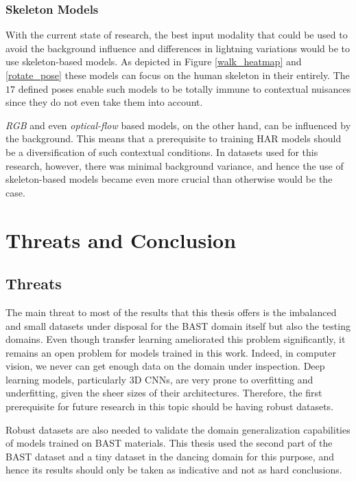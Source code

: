 \documentclass[extern,palatino]{cgMA}
\begin{document}
\subsubsection{Skeleton Models}
\label{research_question_5_4}
With the current state of research, the best input modality that could be used to avoid the background influence and differences in lightning variations would be to use skeleton-based models. As depicted in Figure \ref{walk_heatmap} and \ref{rotate_pose} these models can focus on the human skeleton in their entirely. The $17$ defined poses enable such models to be totally immune to contextual nuisances since they do not even take them into account.

\textit{RGB} and even \textit{optical-flow} based models, on the other hand, can be influenced by the background. This means that a prerequisite to training HAR models should be a diversification of such contextual conditions. In datasets used for this research, however, there was minimal background variance, and hence the use of skeleton-based models became even more crucial than otherwise would be the case. 


\newpage
\section{Threats and Conclusion}
\label{threats_and_conclusion}

\subsection{Threats}
\label{threats}
The main threat to most of the results that this thesis offers is the imbalanced and small datasets under disposal for the BAST domain itself but also the testing domains. Even though transfer learning ameliorated this problem significantly, it remains an open problem for models trained in this work. Indeed, in computer vision, we never can get enough data on the domain under inspection. Deep learning models, particularly 3D CNNs, are very prone to overfitting and underfitting, given the sheer sizes of their architectures. Therefore, the first prerequisite for future research in this topic should be having robust datasets.

\bigskip 
\noindent Robust datasets are also needed to validate the domain generalization capabilities of models trained on BAST materials. This thesis used the second part of the BAST dataset and a tiny dataset in the dancing domain for this purpose, and hence its results should only be taken as indicative and not as hard conclusions.
\end{document}
